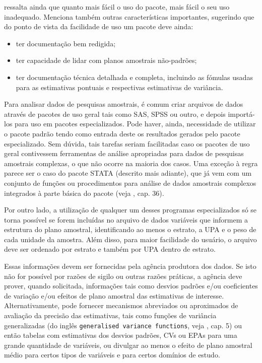 \documentclass[]{book}
\numberwithin{example}{chapter}
\numberwithin{remark}{chapter}
\numberwithin{definition}{chapter}
\begin{document}
\citep{carlson} ressalta ainda que quanto mais fácil o uso do pacote,
mais fácil o seu uso inadequado. Menciona também outras características
importantes, sugerindo que do ponto de vista da facilidade de uso um
pacote deve ainda:

\begin{itemize}
\item
  ter documentação bem redigida;
\item
  ter capacidade de lidar com planos amostrais não-padrões;
\item
  ter documentação técnica detalhada e completa, incluindo as fómulas
  usadas para as estimativas pontuais e respectivas estimativas de
  variância.
\end{itemize}

Para analisar dados de pesquisas amostrais, é comum criar arquivos de
dados através de pacotes de uso geral tais como SAS, SPSS ou outro, e
depois importá-los para uso em pacotes especializados. Pode haver,
ainda, necessidade de utilizar o pacote padrão tendo como entrada deste
os resultados gerados pelo pacote especializado. Sem dúvida, tais
tarefas seriam facilitadas caso os pacotes de uso geral contivessem
ferramentas de análise apropriadas para dados de pesquisas amostrais
complexas, o que não ocorre na maioria dos casos. Uma exceção à regra
parece ser o caso do pacote STATA (descrito mais adiante), que já vem
com um conjunto de funções ou procedimentos para análise de dados
amostrais complexos integrados à parte básica do pacote (veja
\citep{Stata}, cap. 36).

Por outro lado, a utilização de qualquer um desses programas
especializados só se torna possível se forem incluídas no arquivo de
dados variáveis que informem a estrutura do plano amostral,
identificando ao menos o estrato, a UPA e o peso de cada unidade da
amostra. Além disso, para maior facilidade do usuário, o arquivo deve
ser ordenado por estrato e também por UPA dentro de estrato.

Essas informações devem ser fornecidas pela agência produtora dos dados.
Se isto não for possível por razões de sigilo ou outras razões práticas,
a agência deve prover, quando solicitada, informações tais como desvios
padrões e/ou coeficientes de variação e/ou efeitos de plano amostral das
estimativas de interesse. Alternativamente, pode fornecer mecanismos
abreviados ou aproximados de avaliação da precisão das estimativas, tais
como funções de variância generalizadas (do inglês
\texttt{generalised\ variance\ functions}, veja \citep{W85}, cap. 5) ou
então tabelas com estimativas dos desvios padrões, CVs ou EPAs para uma
grande quantidade de variáveis, ou divulgar ao menos o efeito de plano
amostral médio para certos tipos de variáveis e para certos domínios de
estudo.
\end{document}
